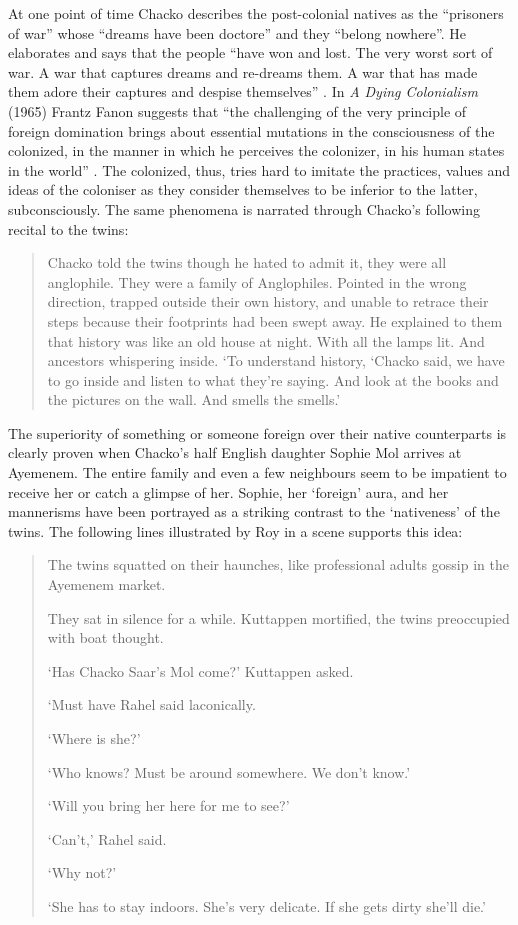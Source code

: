 At one point of time Chacko describes the post-colonial natives as the ``prisoners of war'' whose ``dreams have been doctore'' and they ``belong nowhere''. He elaborates and says that the people ``have won and lost. The very worst sort of war. A war that captures dreams and re-dreams them. A war that has made them adore their captures and despise themselves'' \parencite[53]{Roy1997}. In \emph{A Dying Colonialism} (1965) Frantz Fanon suggests that ``the challenging of the very principle of foreign domination brings about essential mutations in the consciousness of the colonized, in the manner in which he perceives the colonizer, in his human states in the world'' \parencite[130]{Gandhi1998}. The colonized, thus, tries hard to imitate the practices, values and ideas of the coloniser as they consider themselves to be inferior to the latter, subconsciously. The same phenomena is narrated through Chacko's following recital to the twins:

\begin{quote}
  Chacko told the twins though he hated to admit it, they were all anglophile. They were a family of Anglophiles. Pointed in the wrong direction, trapped outside their own history, and unable to retrace their steps because their footprints had been swept away. He explained to them that history was like an old house at night. With all the lamps lit. And ancestors whispering inside. `To understand history, `Chacko said, we have to go inside and listen to what they're saying. And look at the books and the pictures on the wall. And smells the smells.' \parencite[52]{Roy1997}
\end{quote}

The superiority of something or someone foreign over their native counterparts is clearly proven when Chacko's half English daughter Sophie Mol arrives at Ayemenem. The entire family and even a few neighbours seem to be impatient to receive her or catch a glimpse of her. Sophie, her `foreign' aura, and her mannerisms have been portrayed as a striking contrast to the `nativeness' of the twins. The following lines illustrated by Roy in a scene supports this idea:

\begin{quote}
  The twins squatted on their haunches, like professional adults gossip in the Ayemenem market.

  They sat in silence for a while. Kuttappen mortified, the twins preoccupied with boat thought. 

  `Has Chacko Saar's Mol come?' Kuttappen asked.
  
  `Must have Rahel said laconically. 
  
  `Where is she?' 

  `Who knows? Must be around somewhere. We don't know.' 

  `Will you bring her here for me to see?' 

  `Can't,' Rahel said. 

  `Why not?' 

  `She has to stay indoors. She's very delicate. If she gets dirty she'll die.' \parencite[209, 210]{Roy1997}
\end{quote}

